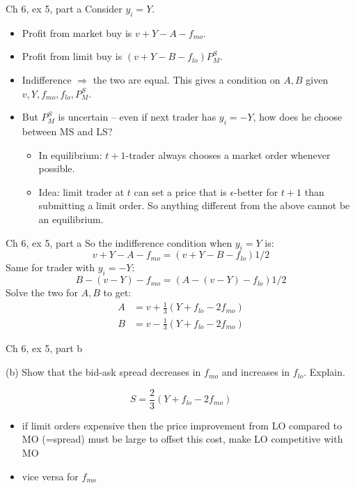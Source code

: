 \documentclass[english,10pt
,aspectratio=169
]{beamer}
\begin{document}
\begin{frame}{Ch 6, ex 5, part a}
	Consider $y_i = Y$. 
	\begin{itemize}
		\item Profit from market buy is $v+Y-A-f_{mo}$.
		\item Profit from limit buy is $(v+Y-B-f_{lo})P_M^S$.
		\item Indifference $\Rightarrow$ the two are equal. This gives a condition on $A,B$ given $v,Y,f_{mo},f_{lo},P_M^S$. 
		\item But $P_M^S$ is uncertain -- even if next trader has $y_i=-Y$, how does he choose between MS and LS?
		\begin{itemize}
			\item In equilibrium: $t+1$-trader always chooses a market order whenever possible.
			\item Idea: limit trader at $t$ can set a price that is $\epsilon$-better for $t+1$ than submitting a limit order. So anything different from the above cannot be an equilibrium.
		\end{itemize}
	\end{itemize}
\end{frame}


\begin{frame}{Ch 6, ex 5, part a}
	So the indifference condition when $y_i=Y$ is:
	\[ v+Y-A-f_{mo} = (v+Y-B-f_{lo})1/2 \]
	Same for trader with $y_i = -Y$:
	\[ B-(v-Y)-f_{mo} = (A-(v-Y)-f_{lo})1/2 \]
	Solve the two for $A,B$ to get:
	\begin{align*}
		A &= v + \frac{1}{3}(Y+f_{lo}-2f_{mo})
		\\
		B &= v - \frac{1}{3}(Y+f_{lo}-2f_{mo})
	\end{align*}
\end{frame}


\begin{frame}{Ch 6, ex 5, part b}
	\begin{exampleblock}{}
		(b) Show that the bid-ask spread decreases in $f_{mo}$ and increases in $f_{lo}$. Explain.
	\end{exampleblock}
	
	\pause
	
	\[ S = \frac{2}{3}(Y+f_{lo}-2f_{mo}) \]
	\begin{itemize}
		\item if limit orders expensive then the price improvement from LO compared to MO (=spread) must be large to offset this cost, make LO competitive with MO
		\item vice versa for $f_{mo}$
	\end{itemize}
\end{frame}
\end{document}
